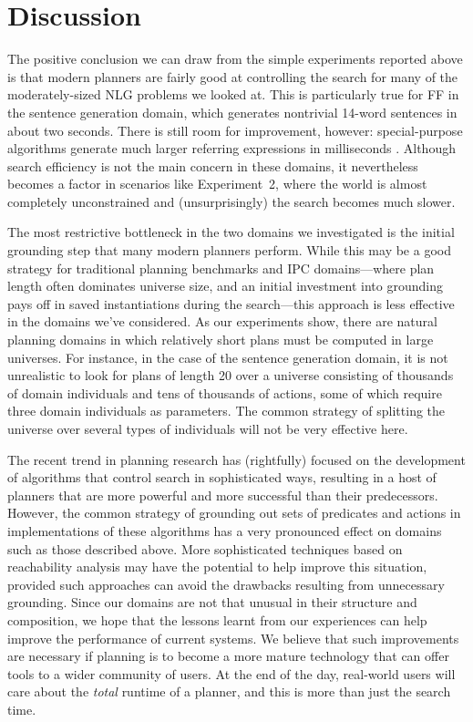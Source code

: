 \section{Discussion} \label{sec:discussion}

The positive conclusion we can draw from the simple experiments
reported above is that modern planners are fairly good at controlling
the search for many of the moderately-sized NLG problems we looked
at. This is particularly true for FF in the sentence generation
domain, which generates nontrivial 14-word sentences in about two seconds.
There is still room for improvement, however: special-purpose
algorithms generate much larger referring expressions in
milliseconds \cite{AreKolStr08}.  Although search efficiency is not the
main concern in these domains, it nevertheless becomes a factor in
scenarios like Experiment~2, where the world is almost completely
unconstrained and (unsurprisingly) the search becomes much slower.

The most restrictive bottleneck in the two domains we investigated is
the initial grounding step that many modern planners perform. While
this may be a good strategy for traditional planning benchmarks and
IPC domains---where plan length often dominates universe size, and an
initial investment into grounding pays off in saved instantiations
during the search---this approach is less effective in the domains
we've considered. As our experiments show, there are natural
planning domains in which relatively short plans must be computed in
large universes. For instance, in the case of the sentence generation
domain, it is not unrealistic to look for plans of length 20 over a
universe consisting of thousands of domain individuals and tens of
thousands of actions, some of which require three domain individuals
as parameters. The common strategy of splitting the universe over
several types of individuals will not be very effective here.

The recent trend in planning research has (rightfully) focused on the
development of algorithms that control search in sophisticated ways,
resulting in a host of planners that are more powerful and more
successful than their predecessors. However, the common strategy of
grounding out sets of predicates and actions in implementations of these
algorithms has a very pronounced effect on domains such as those described
above. More sophisticated techniques based on reachability analysis may
have the potential to help improve this situation, provided such
approaches can avoid the drawbacks resulting from unnecessary grounding.
Since our domains are not that unusual in their structure and composition,
we hope that the lessons learnt from our experiences can help improve the
performance of current systems.  We believe that such improvements are
necessary if planning is to become a more mature technology that can offer
tools to a wider community of users.  At the end of the day, real-world
users will care about the \emph{total} runtime of a planner, and this is
more than just the search time.

